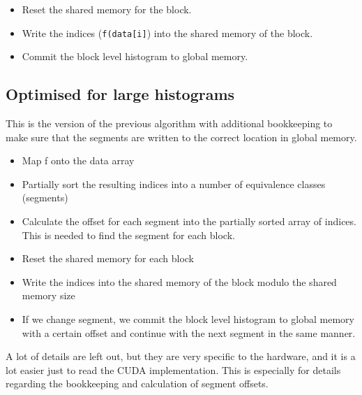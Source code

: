 \documentclass[12pt, a4paper, hidelinks]{article}
\renewcommand{\tt}[1]{\texttt{#1}}
\begin{document}
\begin{itemize}
\item Reset the shared memory for the block.
\item Write the indices (\tt{f(data[i]}) into the shared memory of the block.
\item Commit the block level histogram to global memory.
\end{itemize}

\subsection{Optimised for large histograms}
This is the version of the previous algorithm with additional bookkeeping
to make sure that the segments are written to the correct location in global memory.

\begin{itemize}
\item
  Map f onto the data array
\item
  Partially sort the resulting indices into a number of equivalence classes (segments)
\item
  Calculate the offset for each segment into
  the partially sorted array of indices.
  This is needed to find the segment for each block.
\item
  Reset the shared memory for each block
\item
  Write the indices into the shared memory of the block modulo the shared memory size
\item
  If we change segment,
  we commit the block level histogram to global memory with a certain
  offset and continue with the next segment in the same manner.
\end{itemize}

A lot of details are left out, but they are very specific to the hardware,
and it is a lot easier just to read the CUDA implementation.
This is especially for details regarding the bookkeeping and calculation
of segment offsets.
\end{document}
